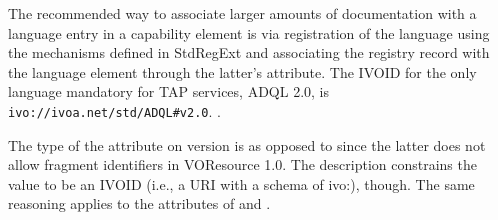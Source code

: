 \documentclass{ivoa}
\begin{document}
The recommended way to associate larger amounts of documentation with a
language entry in a capability element is via registration of the language
using the mechanisms defined in StdRegExt \citep{2012ivoa.spec.0508H} and associating
the registry record with the language element through the latter's 
attribute.  The IVOID for the only language mandatory for TAP services,
ADQL 2.0, is 
\nolinkurl{ivo://ivoa.net/std/ADQL#v2.0}.
.

The type of the  attribute on version is 
 as opposed to  since
the latter does not allow fragment identifiers in VOResource 1.0. 
The description constrains the value to be an
IVOID (i.e., a URI with a schema of ivo:), though.  
The same reasoning applies to the 
attributes of  and .
\end{document}
